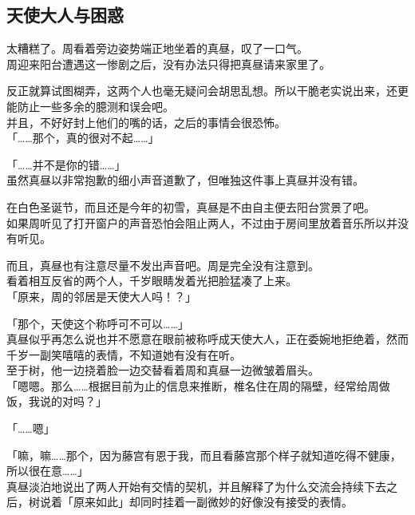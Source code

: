 \subsection{天使大人与困惑}

太糟糕了。周看着旁边姿势端正地坐着的真昼，叹了一口气。\\

周迎来阳台遭遇这一惨剧之后，没有办法只得把真昼请来家里了。

反正就算试图糊弄，这两个人也毫无疑问会胡思乱想。所以干脆老实说出来，还更能防止一些多余的臆测和误会吧。\\

并且，不好好封上他们的嘴的话，之后的事情会很恐怖。\\

「……那个，真的很对不起……」

「……并不是你的错……」\\

虽然真昼以非常抱歉的细小声音道歉了，但唯独这件事上真昼并没有错。

在白色圣诞节，而且还是今年的初雪，真昼是不由自主便去阳台赏景了吧。\\

如果周听见了打开窗户的声音恐怕会阻止两人，不过由于房间里放着音乐所以并没有听见。

而且，真昼也有注意尽量不发出声音吧。周是完全没有注意到。\\

看着相互反省的两个人，千岁眼睛发着光把脸猛凑了上来。\\

「原来，周的邻居是天使大人吗！？」

「那个，天使这个称呼可不可以……」\\

真昼似乎再怎么说也并不愿意在眼前被称呼成天使大人，正在委婉地拒绝着，然而千岁一副笑嘻嘻的表情，不知道她有没有在听。\\

至于树，他一边挠着脸一边交替看着周和真昼一边微皱着眉头。\\

「嗯嗯。那么……根据目前为止的信息来推断，椎名住在周的隔壁，经常给周做饭，我说的对吗？」

「……嗯」

「嘛，嘛……那个，因为藤宫有恩于我，而且看藤宫那个样子就知道吃得不健康，所以很在意……」\\

真昼淡泊地说出了两人开始有交情的契机，并且解释了为什么交流会持续下去之后，树说着「原来如此」却同时挂着一副微妙的好像没有接受的表情。\\

